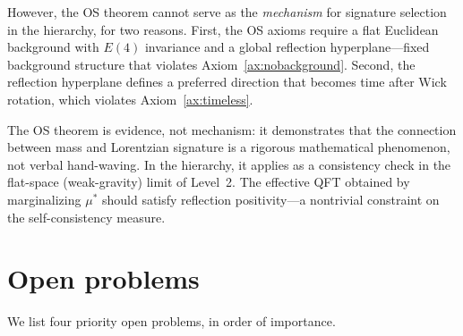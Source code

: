 \documentclass[12pt,a4paper]{article}
\theoremstyle{definition}
\theoremstyle{remark}
\begin{document}
However, the OS theorem cannot serve as the \emph{mechanism} for
signature selection in the hierarchy, for two reasons. First, the OS
axioms require a flat Euclidean background with $E(4)$ invariance and a
global reflection hyperplane---fixed background structure that violates
Axiom~\ref{ax:nobackground}. Second, the reflection hyperplane defines a
preferred direction that becomes time after Wick rotation, which violates
Axiom~\ref{ax:timeless}.

The OS theorem is evidence, not mechanism: it demonstrates that the
connection between mass and Lorentzian signature is a rigorous
mathematical phenomenon, not verbal hand-waving. In the hierarchy, it
applies as a consistency check in the flat-space (weak-gravity) limit
of Level~2. The effective QFT obtained by marginalizing $\mu^*$ should
satisfy reflection positivity---a nontrivial constraint on the
self-consistency measure.

\section{Open problems}
\label{sec:open}

We list four priority open problems, in order of importance.
\end{document}

